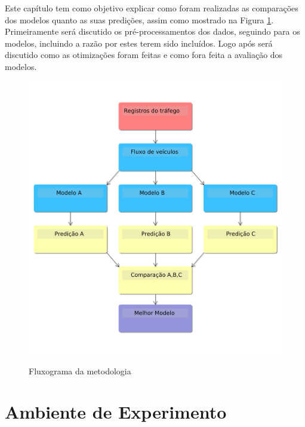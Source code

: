 


Este capítulo tem como objetivo explicar como foram realizadas as comparações dos modelos quanto as suas predições, assim como mostrado na Figura \ref{figure:metodologia}. Primeiramente será discutido os pré-processamentos dos dados, seguindo para os modelos, incluindo a razão por estes terem sido incluídos. Logo após será discutido como as otimizações foram feitas e como fora feita a avaliação dos modelos.

\begin{figure}
    \centering
    \includegraphics[scale=0.4]{monography/img/tccFlux.png}
    \label{figure:metodologia}
    \caption[Fluxograma da metodologia]{Fluxograma da metodologia}
\end{figure}

\section{Ambiente de Experimento}

